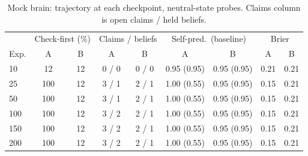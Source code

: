 \begin{table}[h]\centering\small
\caption{Mock brain: trajectory at each checkpoint, neutral-state probes. Claims column is open claims / held beliefs.}
\label{tab:mock_traj}
\begin{tabular}{lcccccccc}\toprule
 & \multicolumn{2}{c}{Check-first (\%)} & \multicolumn{2}{c}{Claims / beliefs} & \multicolumn{2}{c}{Self-pred.\ (baseline)} & \multicolumn{2}{c}{Brier}\\
Exp. & A & B & A & B & A & B & A & B\\\midrule
10 & 12 & 12 & 0 / 0 & 0 / 0 & 0.95 (0.95) & 0.95 (0.95) & 0.21 & 0.21 \\
25 & 100 & 12 & 3 / 1 & 2 / 1 & 1.00 (0.55) & 0.95 (0.95) & 0.15 & 0.21 \\
50 & 100 & 12 & 3 / 1 & 2 / 1 & 1.00 (0.55) & 0.95 (0.95) & 0.15 & 0.21 \\
100 & 100 & 12 & 3 / 2 & 2 / 1 & 1.00 (0.55) & 0.95 (0.95) & 0.15 & 0.21 \\
150 & 100 & 12 & 3 / 2 & 2 / 1 & 1.00 (0.55) & 0.95 (0.95) & 0.15 & 0.21 \\
200 & 100 & 12 & 3 / 2 & 2 / 1 & 1.00 (0.55) & 0.95 (0.95) & 0.15 & 0.21 \\
\bottomrule\end{tabular}\end{table}
